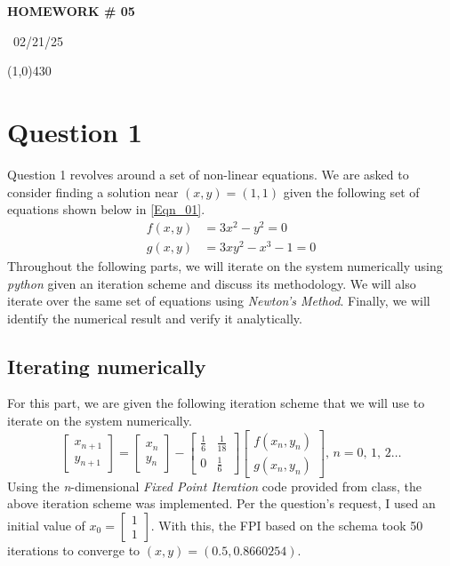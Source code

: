 \documentclass{article}
\begin{document}
\begin{center}
 \LARGE\bfseries HOMEWORK \# 05
\end{center}
\begin{center}
    ~02/21/25~
\end{center}
 \line(1,0){430}

\section{Question 1}
Question 1 revolves around a set of non-linear equations. We are asked to consider finding a solution near \((x,y) = (1,1)\) given the following set of equations shown below in \ref{Eqn_01}.
\begin{equation}
    \label{Eqn_01}
    \begin{split}
        f(x,y) &= 3x^2-y^2 = 0 \\
        g(x,y) &= 3xy^2-x^3-1=0
    \end{split}
\end{equation}
Throughout the following parts, we will iterate on the system numerically using \textit{python} given an iteration scheme and discuss its methodology. We will also iterate over the same set of equations using \textit{Newton's Method}. Finally, we will identify the numerical result and verify it analytically.

\subsection{Iterating numerically}
For this part, we are given the following iteration scheme that we will use to iterate on the system numerically.
\[
\begin{bmatrix}
    x_{n+1} \\
    y_{n+1}
\end{bmatrix}
=
\begin{bmatrix}
    x_n \\
    y_n
\end{bmatrix}
-
\begin{bmatrix}
    \frac{1}{6} & \frac{1}{18} \\
    0 & \frac{1}{6}
\end{bmatrix}
\begin{bmatrix}
    f(x_n,y_n) \\
    g(x_n,y_n)
\end{bmatrix}
\mbox{, } n = 0\mbox{, }1\mbox{, }2 \dots
\]
Using the \textit{n}-dimensional \textit{Fixed Point Iteration} code provided from class, the above iteration scheme was implemented. Per the question's request, I used an initial value of \(x_0=\begin{bmatrix}
    1 \\ 1
\end{bmatrix}\).
With this, the FPI based on the schema took 50 iterations to converge to \((x,y) = (0.5,0.8660254)\).
\end{document}
